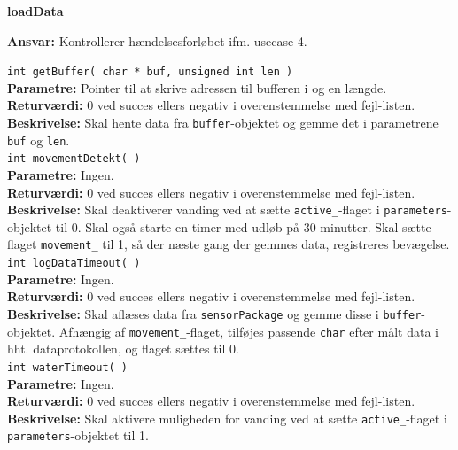 {\centering
\textbf{loadData}\par
}
\textbf{Ansvar:} Kontrollerer hændelsesforløbet ifm. usecase 4. \

\verb+int getBuffer( char * buf, unsigned int len )+ \\
\textbf{Parametre:} Pointer til at skrive adressen til bufferen i og en længde. \\
\textbf{Returværdi:} 0 ved succes ellers negativ i overenstemmelse med fejl-listen. \\
\textbf{Beskrivelse:} Skal hente data fra \verb+buffer+-objektet og gemme det i parametrene \verb+buf+ og \verb+len+. \\

\verb+int movementDetekt( )+ \\
\textbf{Parametre:} Ingen. \\
\textbf{Returværdi:} 0 ved succes ellers negativ i overenstemmelse med fejl-listen. \\
\textbf{Beskrivelse:} Skal deaktiverer vanding ved at sætte \verb+active_+-flaget i \verb+parameters+-objektet til 0. Skal også starte en timer med udløb på 30 minutter. Skal sætte flaget \verb+movement_+ til 1, så der næste gang der gemmes data, registreres bevægelse. \\

\verb+int logDataTimeout( )+ \\
\textbf{Parametre:} Ingen. \\
\textbf{Returværdi:} 0 ved succes ellers negativ i overenstemmelse med fejl-listen. \\
\textbf{Beskrivelse:} Skal aflæses data fra \verb+sensorPackage+ og gemme disse i \verb+buffer+-objektet. Afhængig af \verb+movement_+-flaget, tilføjes passende \verb+char+ efter målt data i hht. dataprotokollen, og flaget sættes til 0. \\

\verb+int waterTimeout( )+ \\
\textbf{Parametre:} Ingen. \\
\textbf{Returværdi:} 0 ved succes ellers negativ i overenstemmelse med fejl-listen. \\
\textbf{Beskrivelse:} Skal aktivere muligheden for vanding ved at sætte \verb+active_+-flaget i \verb+parameters+-objektet til 1. \\
